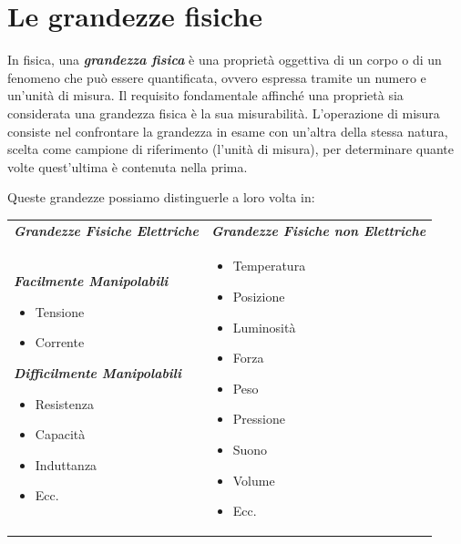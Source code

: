 \documentclass[12pt, letterpaper]{book}
\begin{document}
  \section{Le grandezze fisiche}

  In fisica, una \textbf{\textit{grandezza fisica}} è una proprietà oggettiva di un corpo o di un fenomeno che può essere quantificata, ovvero espressa tramite un numero e un'unità di misura. Il requisito fondamentale affinché una proprietà sia considerata una grandezza fisica è la sua misurabilità. L'operazione di misura consiste nel confrontare la grandezza in esame con un'altra della stessa natura, scelta come campione di riferimento (l'unità di misura), per determinare quante volte quest'ultima è contenuta nella prima.

  Queste grandezze possiamo distinguerle a loro volta in:

  \begin{table}[H]
    \centering
    \begin{tabular}[t]{@{} p{} p{} @{}}
      \multicolumn{1}{c}{\textbf{\textit{Grandezze Fisiche Elettriche}}} & \multicolumn{1}{c}{\textbf{\textit{Grandezze Fisiche non Elettriche}}} \\[1em]
      
      \vspace{0pt}
      \textbf{\textit{Facilmente Manipolabili}}
      \begin{itemize}[leftmargin=*, nosep]
        \item Tensione
        \item Corrente
      \end{itemize}
      
      \vspace{1em} %
      
      \textbf{\textit{Difficilmente Manipolabili}}
      \begin{itemize}[leftmargin=*, nosep]
        \item Resistenza
        \item Capacità
        \item Induttanza
        \item Ecc.
      \end{itemize}
      &
      \vspace{0pt}
      \begin{itemize}[leftmargin=*, nosep]
        \item Temperatura
        \item Posizione
        \item Luminosità
        \item Forza
        \item Peso
        \item Pressione
        \item Suono
        \item Volume
        \item Ecc.
      \end{itemize}
    \end{tabular}
  \end{table}
\end{document}
